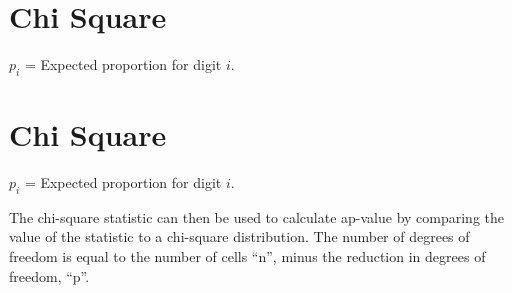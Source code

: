 
\section{Chi Square}


$p_{i}$ = Expected proportion for digit $i$.


\section{Chi Square}


$p_{i}$ = Expected proportion for digit $i$.



The chi-square statistic can then be used to calculate ap-value by comparing the value of the statistic to a chi-square distribution. The number of degrees of freedom is equal to the number of cells ``n'', minus the reduction in degrees of freedom, ``p''.
